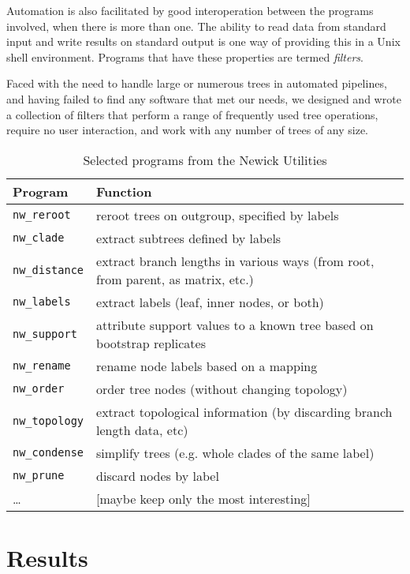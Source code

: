 \documentclass[a4paper,11pt]{article}
\newcommand{\unix}{Unix}
\newcommand{\prog}[1]{\texttt{nw\_#1}}
\begin{document}
Automation is also facilitated by good interoperation between the programs involved, when there is more than one. The ability to read data from standard input and write results on standard output is one way of providing this in a \unix{} shell environment. Programs that have these properties are termed \textit{filters}.

Faced with the need to handle large or numerous trees in automated pipelines, and having failed to find any software that met our needs, we designed and wrote a collection of filters that perform a range of frequently used tree operations, require no user interaction, and work with any number of trees of any size. 

\begin{table*}
\begin{tabular}{lp{}}
Program & Function \\ 
\hline 
\prog{reroot} & reroot trees on outgroup, specified by labels \\
\prog{clade} & extract subtrees defined by labels \\
\prog{distance} & extract branch lengths in various ways (from root, from parent, as matrix, etc.) \\
\prog{labels} & extract labels (leaf, inner nodes, or both) \\
\prog{support} & attribute support values to a known tree based on bootstrap replicates \\
\prog{rename} & rename node labels based on a mapping \\
\prog{order} & order tree nodes (without changing topology) \\
\prog{topology} & extract topological information (by discarding branch length data, etc) \\
\prog{condense} & simplify trees (e.g. whole clades of the same label) \\
\prog{prune} & discard nodes by label \\
 \ldots & [maybe keep only the most interesting] \\
\hline
\end{tabular}
\caption{Selected programs from the Newick Utilities}
\label{tab:NU_func}
\end{table*}



\section*{Results}
\end{document}
